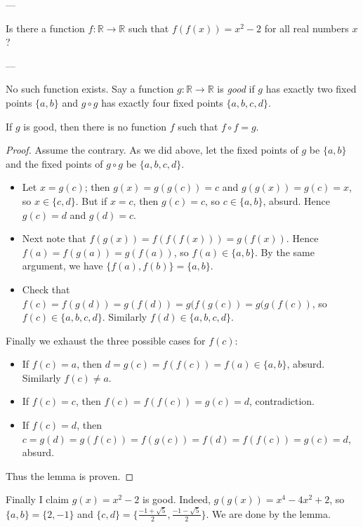 
---

Is there a function $f:\mathbb R\to\mathbb R$ such that $f(f(x))=x^2-2$ for all real numbers $x$?

---

No such function exists. Say a function $g:\mathbb R\to\mathbb R$ is \emph{good} if $g$ has exactly two fixed points $\{a,b\}$ and $g\circ g$ has exactly four fixed points $\{a,b,c,d\}$.
\begin{boxlemma*}
    If $g$ is good, then there is no function $f$ such that $f\circ f=g$.
\end{boxlemma*}
\begin{proof}
    Assume the contrary. As we did above, let the fixed points of $g$ be $\{a,b\}$ and the fixed points of $g\circ g$ be $\{a,b,c,d\}$.
    \begin{itemize}
        \item Let $x=g(c)$; then $g(x)=g(g(c))=c$ and $g(g(x))=g(c)=x$, so $x\in\{c,d\}$. But if $x=c$, then $g(c)=c$, so $c\in\{a,b\}$, absurd. Hence $g(c)=d$ and $g(d)=c$.
        \item Next note that $f(g(x))=f(f(f(x)))=g(f(x))$. Hence $f(a)=f(g(a))=g(f(a))$, so $f(a)\in\{a,b\}$. By the same argument, we have $\{f(a),f(b)\}=\{a,b\}$.
        \item Check that $f(c)=f(g(d))=g(f(d))=g(f(g(c))=g(g(f(c))$, so $f(c)\in\{a,b,c,d\}$. Similarly $f(d)\in\{a,b,c,d\}$.
    \end{itemize}

    Finally we exhaust the three possible cases for $f(c)$:
    \begin{itemize}[itemsep=0em]
        \item If $f(c)=a$, then $d=g(c)=f(f(c))=f(a)\in\{a,b\}$, absurd. Similarly $f(c)\ne a$.
        \item If $f(c)=c$, then $f(c)=f(f(c))=g(c)=d$, contradiction.
        \item If $f(c)=d$, then $c=g(d)=g(f(c))=f(g(c))=f(d)=f(f(c))=g(c)=d$, absurd.
    \end{itemize}
    Thus the lemma is proven.
\end{proof}

Finally I claim $g(x)=x^2-2$ is good. Indeed, $g(g(x))=x^4-4x^2+2$, so $\{a,b\}=\{2,-1\}$ and $\{c,d\}=\{\tfrac{-1+\sqrt5}2,\tfrac{-1-\sqrt5}2\}$. We are done by the lemma.

